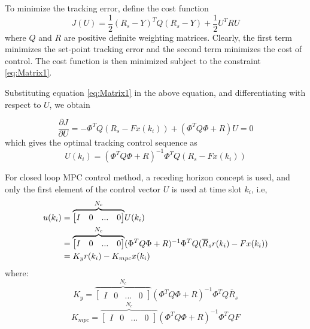             To minimize the tracking error, define the cost function
            \begin{equation}
                \label{eq:Cost1}
                J(U) = \frac12(R_s-Y)^TQ(R_s-Y)+\frac12 U^T R  U
            \end{equation}
            where $Q$ and $R$ are positive definite weighting matrices.  Clearly, the first term minimizes the set-point tracking error and the second term minimizes the cost of control.  The cost function is then minimized subject to the constraint \eqref{eq:Matrix1}.
            
            Substituting equation \eqref{eq:Matrix1} in the above equation, and differentiating with respect to $U$, we obtain
            
            $$\frac{\partial J}{\partial U} = - \Phi^TQ(R_s-Fx(k_i))+(\Phi^{T}Q\Phi + R)U  = 0$$
            which gives the optimal tracking control sequence as
            \begin{equation}
                \label{eq:Optimal1}
                U(k_i) = (\Phi^{T}Q\Phi + R)^{-1}\Phi^{T}Q(R_{s}-Fx(k_i))
            \end{equation}
            
            For closed loop MPC control method, a receding horizon concept is used, and only the first element of the control vector $U$ is used at time slot $k_i$, i.e,
            \begin{equation}
                \label{eq:Control1}
                \aligned
                    u(k_i) &= \overset{N_c}{\overbrace{\begin{bmatrix} I& 0 & ... & 0 \end{bmatrix}}} U(k_i) \\
                           &= \overset{N_c}{\overbrace{\begin{bmatrix} I& 0 & ... & 0 \end{bmatrix}}} (\Phi^{T}Q\Phi + R)^{-1}\Phi^{T} Q( \overline{R}_s r(k_i)-Fx(k_i)) \\
                           &= K_y r(k_i) - K_{mpc} x(k_i)
                \endaligned
            \end{equation}
            where:
            \begin{equation}
                \label{eq:Ky1}
                K_y = \overset{N_c}{\overbrace{\begin{bmatrix} I& 0 & ... & 0 \end{bmatrix}}} (\Phi^{T}Q\Phi + R)^{-1}\Phi^{T} Q\overline{R}_s
            \end{equation}
            \begin{equation}
                \label{eq:Kmpc1}
                K_{mpc} = \overset{N_c}{\overbrace{\begin{bmatrix} I& 0 & ... & 0 \end{bmatrix}}} (\Phi^{T}Q\Phi + R)^{-1}\Phi^{T}Q F
            \end{equation}
            
